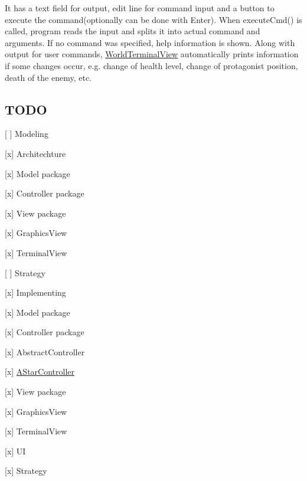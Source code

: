 It has a text field for output, edit line for command input and a button to execute the command(optionally can be done with {\ttfamily Enter}). When {\ttfamily execute\+Cmd()} is called, program reads the input and splits it into actual command and arguments. If no command was specified, help information is shown. Along with output for user commands, {\ttfamily \hyperlink{classWorldTerminalView}{World\+Terminal\+View}} automatically prints information if some changes occur, e.\+g. change of health level, change of protagonist position, death of the enemy, etc.

\subsection*{T\+O\+DO}


\begin{DoxyItemize}
\item \mbox{[} \mbox{]} Modeling
\begin{DoxyItemize}
\item \mbox{[}x\mbox{]} Architechture
\item \mbox{[}x\mbox{]} Model package
\item \mbox{[}x\mbox{]} Controller package
\item \mbox{[}x\mbox{]} View package
\begin{DoxyItemize}
\item \mbox{[}x\mbox{]} Graphics\+View
\item \mbox{[}x\mbox{]} Terminal\+View
\end{DoxyItemize}
\item \mbox{[} \mbox{]} Strategy
\end{DoxyItemize}
\item \mbox{[}x\mbox{]} Implementing
\begin{DoxyItemize}
\item \mbox{[}x\mbox{]} Model package
\item \mbox{[}x\mbox{]} Controller package
\begin{DoxyItemize}
\item \mbox{[}x\mbox{]} Abstract\+Controller
\item \mbox{[}x\mbox{]} \hyperlink{classAStarController}{A\+Star\+Controller}
\end{DoxyItemize}
\item \mbox{[}x\mbox{]} View package
\begin{DoxyItemize}
\item \mbox{[}x\mbox{]} Graphics\+View
\item \mbox{[}x\mbox{]} Terminal\+View
\end{DoxyItemize}
\item \mbox{[}x\mbox{]} UI
\item \mbox{[}x\mbox{]} Strategy 
\end{DoxyItemize}
\end{DoxyItemize}